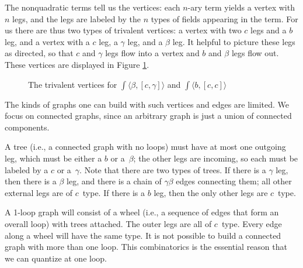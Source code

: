 The nonquadratic terms tell us the vertices:
each $n$-ary term yields a vertex with $n$ legs,
and the legs are labeled by the $n$ types of fields appearing in the term.
For us there are thus two types of trivalent vertices:
a vertex with two $c$ legs and a $b$ leg, 
and a vertex with a $c$ leg, a $\gamma$ leg, and a $\beta$ leg.
It helpful to picture these legs as directed,
so that $c$ and $\gamma$ legs flow into a vertex
and $b$ and $\beta$ legs flow out. 
These vertices are displayed in Figure \ref{fig:verts}.

\begin{figure}
\caption{The trivalent vertices for $\int \langle \beta, [c,\gamma] \rangle$ and $\int \langle b, [c,c] \rangle$}
\label{fig:verts}
\end{figure}

The kinds of graphs one can build with such vertices and edges are limited.
We focus on connected graphs, since an arbitrary graph is just a union of connected components.

A tree (i.e., a connected graph with no loops) must have at most one outgoing leg,
which must be either a $b$ or a~$\beta$;
the other legs are incoming, so each must be labeled by a $c$ or a~$\gamma$.
Note that there are two types of trees.
If there is a $\gamma$ leg, then there is a $\beta$ leg,
and there is a chain of $\gamma\beta$ edges connecting them;
all other external legs are of $c$~type.
If there is a $b$ leg, then the only other legs are $c$~type.

A 1-loop graph will consist of a wheel (i.e., a sequence of edges that form an overall loop)
with trees attached.
The outer legs are all of $c$~type.
Every edge along a wheel will have the same type.
It is not possible to build a connected graph with more than one loop.
This combinatorics is the essential reason that we can quantize at one loop.

